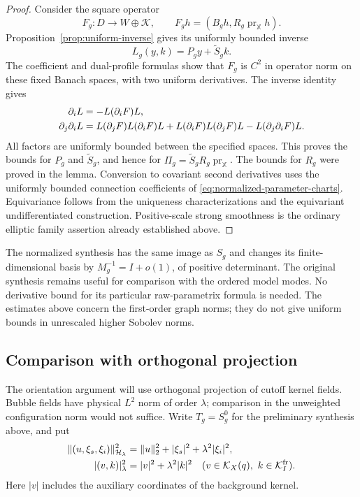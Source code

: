 \documentclass[11pt]{amsart}
\theoremstyle{definition}
\theoremstyle{remark}
\theoremstyle{plain}
\newcommand{\cK}{\mathcal{K}}
\begin{document}
\begin{proof}
Consider the square operator
\begin{equation}\label{eq:square-augmented-family}
 F_g:D\longrightarrow W\oplus\cK,\qquad
 F_gh=(B_gh,R_g\operatorname{pr}_{\mathbb X}h).
\end{equation}
Proposition~\ref{prop:uniform-inverse} gives its uniformly bounded inverse
\begin{equation}\label{eq:square-family-inverse}
 L_g(y,k)=P_gy+\widetilde S_gk.
\end{equation}
The coefficient and dual-profile formulas show that $F_g$ is $C^2$ in
operator norm on these fixed Banach spaces, with two uniform derivatives.
The inverse identity gives
\begin{align}\label{eq:inverse-parameter-derivatives}
 \partial_iL&=-L(\partial_iF)L,\notag\\
 \partial_j\partial_iL
 &=L(\partial_jF)L(\partial_iF)L
  +L(\partial_iF)L(\partial_jF)L
  -L(\partial_j\partial_iF)L.
\end{align}
All factors are uniformly bounded between the specified spaces.
This proves the bounds for $P_g$ and $\widetilde S_g$, and hence for
$\Pi_g=\widetilde S_gR_g\operatorname{pr}_{\mathbb X}$.
The bounds for $R_g$ were proved in the lemma.  Conversion to covariant
second derivatives uses the uniformly bounded connection coefficients of
\eqref{eq:normalized-parameter-charts}.  Equivariance follows from the
uniqueness characterizations and the equivariant undifferentiated
construction.  Positive-scale strong smoothness is the ordinary elliptic
family assertion already established above.
\end{proof}

The normalized synthesis has the same image as $S_g$ and changes its
finite-dimensional basis by $M_g^{-1}=I+o(1)$, of positive determinant.
The original synthesis remains useful for comparison with the ordered
model modes.  No derivative bound for its particular raw-parametrix
formula is needed.  The estimates above concern the first-order graph
norms; they do not give uniform bounds in unrescaled higher Sobolev norms.

\subsection{Comparison with orthogonal projection}
The orientation argument will use orthogonal projection of cutoff kernel
fields.  Bubble fields have physical $L^2$ norm of order $\lambda$;
comparison in the unweighted configuration norm would not suffice.
Write $T_g=S_g^0$ for the preliminary synthesis above, and put
\begin{align}\label{eq:weak-physical-norms}
 \|(u,\xi_s,\xi_i)\|_{\mathcal H_\lambda}^2
 &=\|u\|_2^2+|\xi_s|^2+\lambda^2|\xi_i|^2,\notag\\
 |(v,k)|_\lambda^2&=|v|^2+\lambda^2|k|^2
 \quad(v\in\cK_X(q),\ k\in\cK_I^{\rm fr}).
\end{align}
Here $|v|$ includes the auxiliary coordinates of the background kernel.
\end{document}
